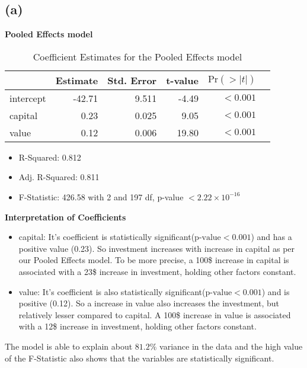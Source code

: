 \documentclass[a4paper]{article}
\begin{document}
\subsection*{(a)}
\textbf{Pooled Effects model}
\begin{table}[ht]
    \centering
    \begin{tabular}{@{}lrrrrr@{}}
        \toprule
                & Estimate  & Std. Error  & t-value & \(\text{Pr}(>|t|)\)\\
                \midrule
        intercept & -42.71 & 9.511 & -4.49 & \(<0.001\)\\
        capital   & 0.23   & 0.025 & 9.05  & \(<0.001\)\\
        value     & 0.12   & 0.006 & 19.80 & \(<0.001\)\\
        \bottomrule
    \end{tabular}
    \caption{Coefficient Estimates for the Pooled Effects model}
\end{table}
\begin{itemize}
    \item R-Squared: 0.812
    \item Adj. R-Squared: 0.811
    \item F-Statistic: 426.58 with 2 and 197 df, p-value \(<2.22 \times 10^{-16}\) 
\end{itemize}

\textbf{Interpretation of Coefficients}
\begin{itemize}
    \item capital: It's coefficient is statistically significant(\(\text{p-value}<0.001\)) and has a positive value (0.23). So investment increases with increase in capital as per our Pooled Effects model. To be more precise, a 100\$ increase in capital is associated with a 23\$ increase in investment, holding other factors constant.
    \item value: It's coefficient is also statistically significant(\(\text{p-value}<0.001\)) and is positive (0.12). So a increase in value also increases the investment, but relatively lesser compared to capital. A 100\$ increase in value is associated with a 12\$ increase in investment, holding other factors constant.
\end{itemize}

The model is able to explain about \(81.2\%\) variance in the data and the high value of the F-Statistic also shows that the variables are statistically significant.

\newpage
\end{document}
